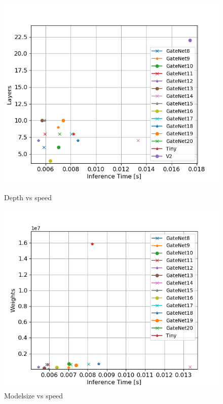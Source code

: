 \documentclass{article}
\begin{document}
\begin{figure}
	\centering
	\begin{minipage}{0.45\linewidth}
		\includegraphics[width=\linewidth]{fig/layers_speed}
		\caption{Depth vs speed}
	\end{minipage}
	\begin{minipage}{0.45\linewidth}
		\includegraphics[width=\linewidth]{fig/weights_speed}
		\caption{Modelsize vs speed}
	\end{minipage}
	
\end{figure}
\end{document}
